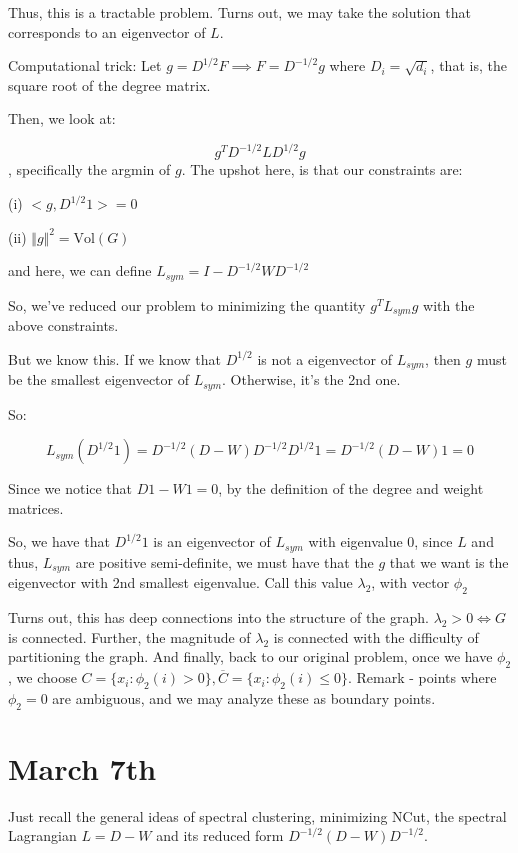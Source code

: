 \documentclass[10pt]{article}
\newcommand{\vol}{\text{Vol}}
\begin{document}
Thus, this is a tractable problem. Turns out, we may take the solution that corresponds to an eigenvector of $L$. 

Computational trick: Let $g = D^{1/2}F \implies F = D^{-1/2}g$ where $D_i = \sqrt{d_i}$, that is, the square root of the degree matrix. 

Then, we look at:

$$ g^T D^{-1/2} L D^{1/2} g $$, specifically the argmin of $g$. The upshot here, is that our constraints are:

(i) $< g, D^{1/2} 1 > = 0$

(ii) $ \Vert g \Vert^2 = \vol(G)$

and here, we can define $L_{sym} = I - D^{-1/2} W D^{-1/2}$

So, we’ve reduced our problem to minimizing the quantity $ g^T L_{sym} g$ with the above constraints. 

But we know this. If we know that $D^{1/2}$ is not a eigenvector of $L_{sym}$, then $g$ must be the smallest eigenvector of $L_{sym}$. Otherwise, it’s the 2nd one.

So:

$$ L_{sym}(D^{1/2} 1) = D^{-1/2} (D - W) D^{-1/2}D^{1/2} 1 = D^{-1/2} (D - W)  1 = 0$$

Since we notice that $D1 - W1 = 0$, by the definition of the degree and weight matrices.

So, we have that $D^{1/2} 1 $ is an eigenvector of $L_{sym}$ with eigenvalue 0, since $L$ and thus, $L_{sym}$ are positive semi-definite, we must have that the $g$ that we want is the eigenvector with 2nd smallest eigenvalue. Call this value $\lambda_2$, with vector $\phi_2$

Turns out, this has deep connections into the structure of the graph. $\lambda_2 > 0 \iff G$ is connected. Further, the magnitude of $\lambda_2$ is connected with the difficulty of partitioning the graph. And finally, back to our original problem, once we have $\phi_2$, we choose $C = \{  x_i : \phi_2(i) > 0 \}, \overline{C} = \{ x_i : \phi_2(i) \leq 0 \}$. Remark - points where $\phi_2 = 0$ are ambiguous, and we may analyze these as boundary points.

\section*{March 7th}

Just recall the general ideas of spectral clustering, minimizing NCut, the spectral Lagrangian $L = D - W$ and its reduced form $D^{-1/2} (D - W) D^{-1/2}$. 
\end{document}
